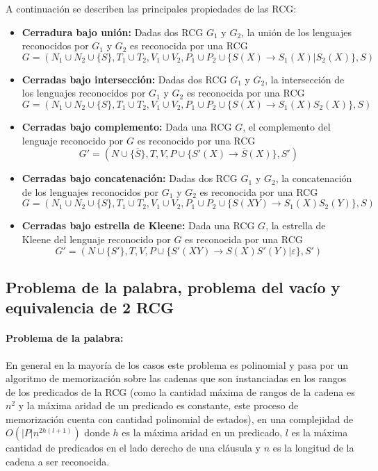 \documentclass{article}
\begin{document}
A continuación se describen las principales propiedades de las RCG:
\begin{itemize}
      \item \textbf{Cerradura bajo unión:} Dadas dos RCG $G_1$ y $G_2$, la unión de los lenguajes reconocidos por $G_1$ y $G_2$ es reconocida por una RCG
            $$G=(N_1\cup N_2\cup \{S\},T_1\cup T_2,V_1\cup V_2,P_1\cup P_2\cup \{S(X)\to S_1(X)|S_2(X)\},S)$$
      \item \textbf{Cerradas bajo intersección:} Dadas dos RCG $G_1$ y $G_2$, la intersección de los lenguajes reconocidos por $G_1$ y $G_2$ es reconocida por una RCG
            $$G=(N_1\cup N_2\cup \{S\},T_1\cup T_2,V_1\cup V_2,P_1\cup P_2\cup \{S(X)\to S_1(X)S_2(X)\},S)$$
      \item \textbf{Cerradas bajo complemento:} Dada una RCG $G$, el complemento del lenguaje reconocido por $G$ es reconocido por una RCG
            $$G'=(N\cup \{\overline{S}\},T,V,P\cup \{S'(X)\to \overline{S}(X)\},S')$$
      \item \textbf{Cerradas bajo concatenación:} Dadas dos RCG $G_1$ y $G_2$, la concatenación de los lenguajes reconocidos por $G_1$ y $G_2$ es reconocida por una RCG
            $$G=(N_1\cup N_2\cup \{S\},T_1\cup T_2,V_1\cup V_2,P_1\cup P_2\cup \{S(XY)\to S_1(X)S_2(Y)\},S)$$
      \item \textbf{Cerradas bajo estrella de Kleene:} Dada una RCG $G$, la estrella de Kleene del lenguaje reconocido por $G$ es reconocida por una RCG
            $$G'=(N\cup \{S'\},T,V,P\cup \{S'(XY)\to S(X)S'(Y)|\varepsilon\},S')$$
\end{itemize}


\subsection{Problema de la palabra, problema del vacío y equivalencia de 2 RCG}

\paragraph{Problema de la palabra:} En general en la mayoría de los casos este problema es polinomial y pasa por
un algoritmo de memorización sobre las cadenas que son instanciadas en los rangos de los predicados de la RCG (como la cantidad
máxima de rangos de la cadena es $n^2$ y la máxima aridad de un predicado es constante, este proceso de memorización cuenta
con cantidad polinomial de estados), en
una complejidad de $O(|P|n^{2h(l+1)})$ donde $h$ es la máxima aridad en un predicado, $l$ es la máxima cantidad de predicados
en el lado derecho de una cláusula y $n$ es la longitud de la cadena a ser reconocida.
\end{document}
